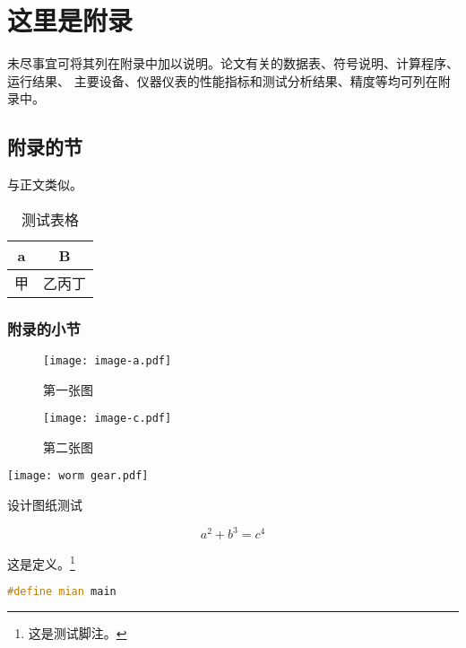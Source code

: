 \chapter{这里是附录}\label{app:1}
未尽事宜可将其列在附录中加以说明。论文有关的数据表、符号说明、计算程序、运行结果、
主要设备、仪器仪表的性能指标和测试分析结果、精度等均可列在附录中。
\section{附录的节}
与正文类似。
\begin{table}[ht]
	\centering
	\caption{测试表格}\label{tab:mytable}
	\begin{tabular}{cc}
		\toprule
		a & B   \\
		\midrule
		甲   & 乙丙丁 \\
		\bottomrule
	\end{tabular}
\end{table}

\subsection{附录的小节}
\zhlipsum[1][name = zhufu]

\begin{figure}[ht]
	\centering
	\begin{minipage}{0.4\textwidth}
		\centering
		\texttt{[image: image-a.pdf]}
		\caption{第一张图}\label{fig:test1}
	\end{minipage}
	\hspace{1cm}
	\begin{minipage}{0.4\textwidth}
		\centering
		\texttt{[image: image-c.pdf]}
		\caption{第二张图}\label{fig:test2}
	\end{minipage}
\end{figure}

\zhlipsum[name = xiangyu]

\begin{dfigure}[tbp]
	\centering\texttt{[image: worm gear.pdf]}
	\caption{设计图纸测试}
\end{dfigure}

\zhlipsum[1][name = aspirin]

\begin{equation}
	a^2+b^3=c^4
\end{equation}

\begin{definition}
	这是定义。\footnote{这是测试脚注。}
\end{definition}

\begin{lstlisting}[language=c++,caption=一个测试,label=mycode]
#define mian main
	\end{lstlisting}

